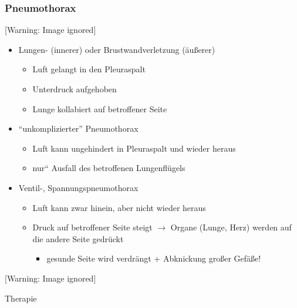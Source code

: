 \subsubsection{Pneumothorax}\label{topic:pneumothorax}

\begin{center}
 [Warning: Image ignored] %
\end{center}

\begin{itemize}
    \item Lungen- (innerer) oder  Brustwandverletzung (\"au{\ss}erer)
    \begin{itemize}
        \item Luft gelangt in den Pleuraspalt
        \item Unterdruck aufgehoben
        \item Lunge kollabiert auf betroffener Seite
    \end{itemize}
    \item "`unkomplizierter"' Pneumothorax
    \begin{itemize}
        \item Luft kann ungehindert in Pleuraspalt und  wieder heraus
        \item {\quotedblbase}nur{\textquotedblleft} Ausfall des betroffenen
        Lungenfl\"ugels
    \end{itemize}
    \item Ventil-, Spannungspneumothorax
    \begin{itemize}
        \item Luft kann zwar hinein, aber nicht wieder  heraus
        \item Druck auf betroffener Seite steigt ${\rightarrow}$  Organe (Lunge,
        Herz) werden auf die andere Seite gedr\"uckt
        \begin{itemize}
            \item gesunde Seite wird verdr\"angt + Abknickung  gro{\ss}er
            Gef\"a{\ss}e!
        \end{itemize}
    \end{itemize}
\end{itemize}

\begin{center}
 [Warning: Image ignored] %
\end{center}
Therapie

